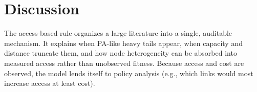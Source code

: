 \documentclass{article}[12pt]
\begin{document}









\section{Discussion}
The access-based rule organizes a large literature into a single, auditable mechanism.  It explains when PA-like heavy tails appear, when capacity and distance truncate them, and how node heterogeneity can be absorbed into measured access rather than unobserved fitness.  Because access and cost are observed, the model lends itself to policy analysis (e.g., which links would most increase access at least cost).

\clearpage


\end{document}
